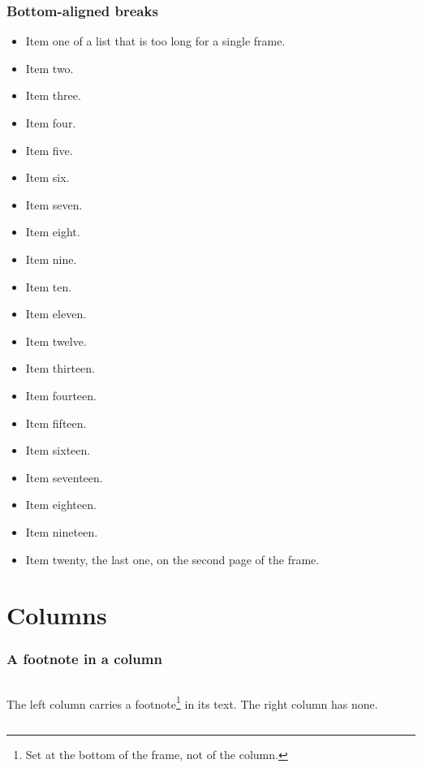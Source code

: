 \documentclass{beamer}
\begin{document}
\begin{frame}[b,allowframebreaks]
  \frametitle{Bottom-aligned breaks}
  \begin{itemize}
    \item Item one of a list that is too long for a single frame.
    \item Item two.
    \item Item three.
    \item Item four.
    \item Item five.
    \item Item six.
    \item Item seven.
    \item Item eight.
    \item Item nine.
    \item Item ten.
    \item Item eleven.
    \item Item twelve.
    \item Item thirteen.
    \item Item fourteen.
    \item Item fifteen.
    \item Item sixteen.
    \item Item seventeen.
    \item Item eighteen.
    \item Item nineteen.
    \item Item twenty, the last one, on the second page of the frame.
  \end{itemize}
\end{frame}

\section{Columns}

\begin{frame}
  \frametitle{A footnote in a column}
  \begin{columns}[T]
      The left column carries a footnote\footnote{Set at the bottom of the
      frame, not of the column.} in its text.
      The right column has none.
  \end{columns}
\end{frame}
\end{document}
